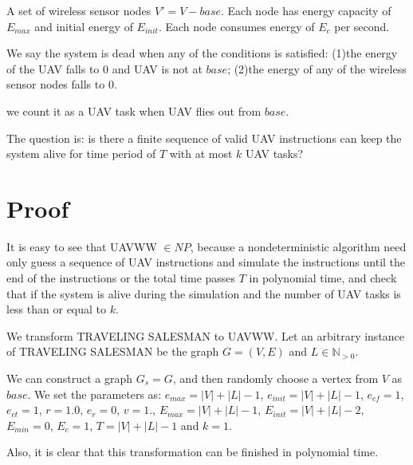\documentclass[11pt]{article}
\begin{document}
A set of wireless sensor nodes $V' = V - {base}$. Each node has energy capacity of $E_{max}$ and initial energy of $E_{init}$. Each node consumes energy of $E_{c}$ per second.

We say the system is dead when any of the conditions is satisfied:
(1)the energy of the UAV falls to 0 and UAV is not at $base$;
(2)the energy of any of the wireless sensor nodes falls to 0.

we count it as a UAV task when UAV flies out from $base$.

The question is: is there a finite sequence of valid UAV instructions can keep the system alive for time period of $T$ with at most $k$ UAV tasks?

\section{Proof}
It is easy to see that UAVWW $\in NP$, because a nondeterministic algorithm need only guess a sequence of UAV instructions and simulate the instructions until the end of the instructions or the total time passes $T$ in polynomial time, and check that if the system is alive during the simulation and the number of UAV tasks is less than or equal to $k$.

We transform TRAVELING SALESMAN to UAVWW. Let an arbitrary instance of TRAVELING SALESMAN be the graph $G = (V, E)$ and $L \in \mathbb{N}_{>0}$.

We can construct a graph $G_s = G$, and then randomly choose a vertex from $V$ as $base$. We set the parameters as: $e_{max} = |V| + |L| - 1$, $e_{init} = |V| + |L| - 1$, $e_{cf} = 1$, $e_{ct} = 1$, $r = 1.0$, $e_r = 0$, $v = 1$., $E_{max} = |V| + |L| - 1$, $E_{init} = |V| + |L| - 2$, $E_{min} = 0$, $E_{c} = 1$, $T = |V| + |L| - 1$ and $k = 1$.

Also, it is clear that this transformation can be finished in polynomial time.
\end{document}
